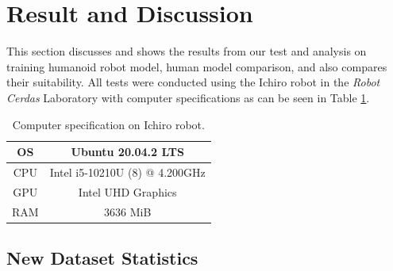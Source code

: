 \section{Result and Discussion}
\label{sec:result-and-discussion}

This section discusses and shows the results from our test and analysis on training humanoid robot model, human model comparison, and also compares their suitability.
All tests were conducted using the Ichiro robot in the \emph{Robot Cerdas} Laboratory with computer specifications as can be seen in Table \ref{tb:computerspecichiro}.
\begin{table}
\caption{Computer specification on Ichiro robot.}
\centering
    \begin{tabular}{|c|c|}
    \hline
    OS      & Ubuntu 20.04.2 LTS \\
    \hline
    CPU     & Intel i5-10210U (8) @ 4.200GHz \\
    \hline
    GPU     & Intel UHD Graphics  \\
    \hline
    RAM     & 3636 MiB \\
    \hline
    \end{tabular}
    \label{tb:computerspecichiro}
\end{table}

\subsection{New Dataset Statistics}
\label{subsec:new-dataset-statistics}

